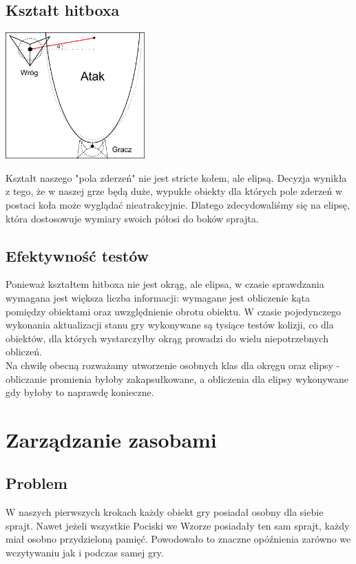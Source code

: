 \documentclass[a4paper,twoside]{article}
\begin{document}
			\subsection{Kształt hitboxa}
				\begin{center}
					\includegraphics[width=0.4\textwidth]{./images/hitbox01}
				\end{center}
				Kształt naszego "pola zderzeń" nie jest stricte kołem, ale elipsą. Decyzja wynikła z tego, że w naszej grze będą duże, wypukłe obiekty dla których pole zderzeń w postaci koła może wyglądać nieatrakcyjnie. Dlatego zdecydowaliśmy się na elipsę, która dostosowuje wymiary swoich półosi do boków sprajta.
			\subsection{Efektywność testów}
				Ponieważ kształtem hitboxa nie jest okrąg, ale elipsa, w czasie sprawdzania wymagana jest większa liczba informacji: wymagane jest obliczenie kąta pomiędzy obiektami oraz uwzględnienie obrotu obiektu. W czasie pojedynczego wykonania aktualizacji stanu gry wykonywane są tysiące testów kolizji, co dla obiektów, dla których wystarczyłby okrąg prowadzi do wielu niepotrzebnych obliczeń.\\
				Na chwilę obecną rozważamy utworzenie osobnych klas dla okręgu oraz elipsy - obliczanie promienia byłoby zakapsułkowane, a obliczenia dla elipsy wykonywane gdy byłoby to naprawdę konieczne.
	
		\section{Zarządzanie zasobami}
			\subsection{Problem}
				W naszych pierwszych krokach każdy obiekt gry posiadał osobny dla siebie sprajt. Nawet jeżeli wszystkie Pociski we Wzorze posiadały ten sam sprajt, każdy miał osobno przydzieloną pamięć. Powodowało to znaczne opóźnienia zarówno we wczytywaniu jak i podczas samej gry.
\end{document}
